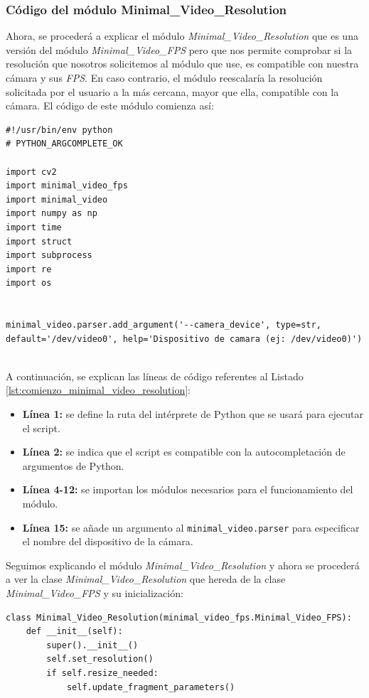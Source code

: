 \newpage

\subsubsection{Código del módulo Minimal\_Video\_Resolution}
Ahora, se procederá a explicar el módulo \textit{Minimal\_Video\_Resolution} que es una versión del módulo \textit{Minimal\_Video\_FPS} pero que nos permite comprobar si la resolución que nosotros solicitemos al módulo que use, es compatible con nuestra cámara y sus \textit{FPS}. En caso contrario, el módulo reescalaría la resolución solicitada por el usuario a la más cercana, mayor que ella, compatible con la cámara. El código de este módulo comienza así:

\begin{lstlisting}[style=pythonstyle, caption={Comienzo del módulo Minimal\_Video\_Resolution.}, label={lst:comienzo_minimal_video_resolution}]
#!/usr/bin/env python
# PYTHON_ARGCOMPLETE_OK

import cv2
import minimal_video_fps
import minimal_video
import numpy as np
import time
import struct
import subprocess
import re
import os


minimal_video.parser.add_argument('--camera_device', type=str, default='/dev/video0', help='Dispositivo de camara (ej: /dev/video0)')
   

\end{lstlisting}
\vspace{\baselineskip}

A continuación, se explican las líneas de código referentes al Listado \ref{lst:comienzo_minimal_video_resolution}:
\begin{itemize}
    \item \textbf{Línea 1:} se define la ruta del intérprete de Python que se usará para ejecutar el script.
    \item \textbf{Línea 2:} se indica que el script es compatible con la autocompletación de argumentos de Python.
    \item \textbf{Línea 4-12:} se importan los módulos necesarios para el funcionamiento del módulo.
    \item \textbf{Línea 15:} se añade un argumento al \texttt{minimal\_video.parser} para especificar el nombre del dispositivo de la cámara.
\end{itemize}
\vspace{\baselineskip}

Seguimos explicando el módulo \textit{Minimal\_Video\_Resolution} y ahora se procederá a ver la clase \textit{Minimal\_Video\_Resolution} que hereda de la clase \textit{Minimal\_Video\_FPS} y su inicialización:
\begin{lstlisting}[style=pythonstyle, caption={Clase e inicialización Minimal\_Video\_Resolution.}, label={lst:class_minimal_video_resolution}]
class Minimal_Video_Resolution(minimal_video_fps.Minimal_Video_FPS):
    def __init__(self):
        super().__init__()
        self.set_resolution()
        if self.resize_needed:
            self.update_fragment_parameters()
\end{lstlisting}
\vspace{\baselineskip}


